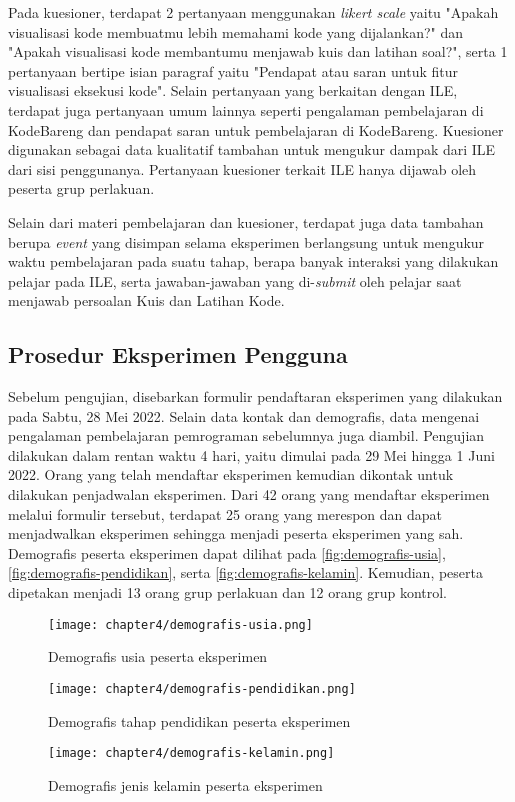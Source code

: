 Pada kuesioner, terdapat 2 pertanyaan menggunakan \textit{likert scale} yaitu "Apakah visualisasi kode membuatmu lebih memahami kode yang dijalankan?" dan "Apakah visualisasi kode membantumu menjawab kuis dan latihan soal?", serta 1 pertanyaan bertipe isian paragraf yaitu "Pendapat atau saran untuk fitur visualisasi eksekusi kode". Selain pertanyaan yang berkaitan dengan ILE, terdapat juga pertanyaan umum lainnya seperti pengalaman pembelajaran di KodeBareng dan pendapat saran untuk pembelajaran di KodeBareng. Kuesioner digunakan sebagai data kualitatif tambahan untuk mengukur dampak dari ILE dari sisi penggunanya. Pertanyaan kuesioner terkait ILE hanya dijawab oleh peserta grup perlakuan.

Selain dari materi pembelajaran dan kuesioner, terdapat juga data tambahan berupa \textit{event} yang disimpan selama eksperimen berlangsung untuk mengukur waktu pembelajaran pada suatu tahap, berapa banyak interaksi yang dilakukan pelajar pada ILE, serta jawaban-jawaban yang di-\textit{submit} oleh pelajar saat menjawab persoalan Kuis dan Latihan Kode.

\subsection{Prosedur Eksperimen Pengguna}
Sebelum pengujian, disebarkan formulir pendaftaran eksperimen yang dilakukan pada Sabtu, 28 Mei 2022. Selain data kontak dan demografis, data mengenai pengalaman pembelajaran pemrograman sebelumnya juga diambil. Pengujian dilakukan dalam rentan waktu 4 hari, yaitu dimulai pada 29 Mei hingga 1 Juni 2022. Orang yang telah mendaftar eksperimen kemudian dikontak untuk dilakukan penjadwalan eksperimen. Dari 42 orang yang mendaftar eksperimen melalui formulir tersebut, terdapat 25 orang yang merespon dan dapat menjadwalkan eksperimen sehingga menjadi peserta eksperimen yang sah. Demografis peserta eksperimen dapat dilihat pada \autoref{fig:demografis-usia}, \autoref{fig:demografis-pendidikan}, serta \autoref{fig:demografis-kelamin}. Kemudian, peserta dipetakan menjadi 13 orang grup perlakuan dan 12 orang grup kontrol.

\begin{figure}[H]
  \centering
  \texttt{[image: chapter4/demografis-usia.png]}
  \caption{Demografis usia peserta eksperimen} \label{fig:demografis-usia}
\end{figure}
\begin{figure}[H]
  \centering
  \texttt{[image: chapter4/demografis-pendidikan.png]}
  \caption{Demografis tahap pendidikan peserta eksperimen} \label{fig:demografis-pendidikan}
\end{figure}
\begin{figure}[H]
  \centering
  \texttt{[image: chapter4/demografis-kelamin.png]}
  \caption{Demografis jenis kelamin peserta eksperimen} \label{fig:demografis-kelamin}
\end{figure}

